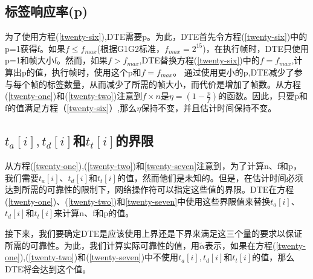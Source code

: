 \documentclass[UTF8]{ctexart}
\begin{document}
\subsection{标签响应率(p)}

为了使用方程(\ref{twenty-six}),DTE需要p。为此，DTE首先令方程(\ref{twenty-six})中的p=1获得f。如果$f \le f_{max}$(根据G1G2标准，$f_{max}=2^{15}$)，在执行帧时，DTE只使用p=1和帧大小f。然而，如果$f > f_{max}$,DTE替换方程(\ref{twenty-six})中的$f=f_{max}$,计算出p的值，执行帧时，使用这个p和$f=f_{max}$。	
通过使用更小的p,DTE减少了参与每个帧的标签数量，从而减少了所需的帧大小，而代价是增加了帧数。从方程(\ref{twenty-one})和(\ref{twenty-two})注意到$f\times n$是$\eta =(1-\frac{p}{f})$的函数。因此，只要p和f的值满足方程（\ref{twenty-six}）,那么$\eta$保持不变，并且估计时间保持不变。

\subsection{$t_a[i],t_d[i]$和$t_t[i]$的界限}

从方程(\ref{twenty-one}),(\ref{twenty-two})和\ref{twenty-seven}注意到，为了计算n、f和p，我们需要$t_a[i]$、$t_d[i]$和$t_t[i]$的值，然而他们是未知的。但是，在估计时间必须达到所需的可靠性的限制下，网络操作符可以指定这些值的界限。DTE在方程(\ref{twenty-one})、(\ref{twenty-two})和\ref{twenty-seven}中使用这些界限值来替换$t_a[i]$、$t_d[i]$和$t_t[i]$来计算n、f和p的值。

接下来，我们要确定DTE是应该使用上界还是下界来满足这三个量的要求以保证所需的可靠性。为此，我们计算实际可靠性的值，用$\widetilde{\alpha}$表示，如果在方程(\ref{twenty-one}),(\ref{twenty-two})和(\ref{twenty-seven})中不使用$t_a[i],t_d[i]和t_t[i]$的值，那么DTE将会达到这个值。
\end{document}
